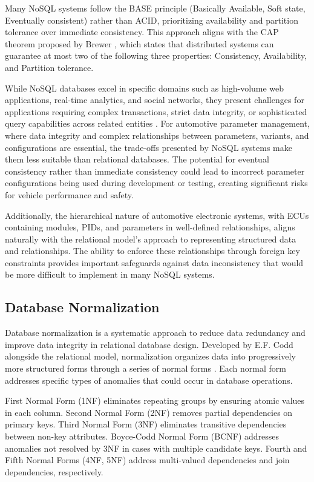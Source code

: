 Many NoSQL systems follow the BASE principle (Basically Available, Soft state, Eventually consistent) rather than ACID, prioritizing availability and partition tolerance over immediate consistency. This approach aligns with the CAP theorem proposed by Brewer \cite{brewer2000robust}, which states that distributed systems can guarantee at most two of the following three properties: Consistency, Availability, and Partition tolerance.

While NoSQL databases excel in specific domains such as high-volume web applications, real-time analytics, and social networks, they present challenges for applications requiring complex transactions, strict data integrity, or sophisticated query capabilities across related entities \cite{kleppmann2017conflict}. For automotive parameter management, where data integrity and complex relationships between parameters, variants, and configurations are essential, the trade-offs presented by NoSQL systems make them less suitable than relational databases. The potential for eventual consistency rather than immediate consistency could lead to incorrect parameter configurations being used during development or testing, creating significant risks for vehicle performance and safety.

Additionally, the hierarchical nature of automotive electronic systems, with ECUs containing modules, PIDs, and parameters in well-defined relationships, aligns naturally with the relational model's approach to representing structured data and relationships. The ability to enforce these relationships through foreign key constraints provides important safeguards against data inconsistency that would be more difficult to implement in many NoSQL systems.

\subsection{Database Normalization}
\label{subsec:database-normalization}

Database normalization is a systematic approach to reduce data redundancy and improve data integrity in relational database design. Developed by E.F. Codd alongside the relational model, normalization organizes data into progressively more structured forms through a series of normal forms \cite{codd1970relational}. Each normal form addresses specific types of anomalies that could occur in database operations.

First Normal Form (1NF) eliminates repeating groups by ensuring atomic values in each column. Second Normal Form (2NF) removes partial dependencies on primary keys. Third Normal Form (3NF) eliminates transitive dependencies between non-key attributes. Boyce-Codd Normal Form (BCNF) addresses anomalies not resolved by 3NF in cases with multiple candidate keys. Fourth and Fifth Normal Forms (4NF, 5NF) address multi-valued dependencies and join dependencies, respectively.

